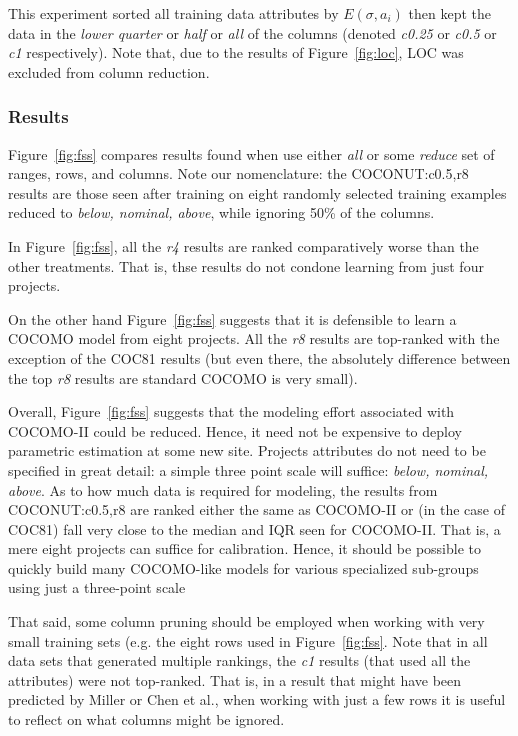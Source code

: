 \documentclass{sig-alternate}
\newcommand{\fig}[1]{Figure~\ref{fig:#1}}
\begin{document}
This experiment sorted all training data attributes by $E(\sigma,a_i)$ then kept
the data in the {\em lower quarter} or  {\em half} or {\em all} of  the columns
(denoted {\em c0.25} or {\em c0.5} or {\em c1} respectively).
Note that, due to the results of \fig{loc}, LOC was excluded from column reduction.



\subsubsection{Results}

\fig{fss} compares results found when use either
{\em all} or some {\em reduce} set of ranges, rows,
and columns. Note our nomenclature:  the
COCONUT:c0.5,r8  results are those
seen after training on eight randomly selected
training examples reduced to {\em below, nominal,
above}, while ignoring 50\% of the columns. 

In \fig{fss}, all the {\em r4} results are ranked
comparatively worse than the other treatments.  That
is, thse results do not condone learning from just
four projects.

On the other hand \fig{fss} suggests that it is defensible
to learn a COCOMO model from eight projects. All the
{\em r8} results are top-ranked with the exception
of the COC81 results (but even there, the absolutely
difference between the top {\em r8} results are
standard COCOMO is very small).

Overall, \fig{fss} suggests that the modeling
effort associated with COCOMO-II could be reduced. Hence,
it need not be expensive to deploy parametric estimation
at some new site.
Projects attributes
do not need to be specified in great detail:
a simple three point scale will suffice:
 {\em below, nominal, above}. As to how much data is
required for modeling, 
the results
from COCONUT:c0.5,r8 are ranked either the same as
COCOMO-II or (in the case of COC81) fall very close
to the median and IQR seen for COCOMO-II.
That is, 
a mere eight projects can
suffice for calibration.
Hence, it
should be possible to quickly build many COCOMO-like
models for various specialized sub-groups using just
a three-point scale

That said, some column pruning should be employed
when working with very small training sets (e.g.
the eight rows used in \fig{fss}. 
Note that
in all data sets that generated multiple rankings,
the {\em c1} results (that used all the attributes)
were not top-ranked. That is, in a result that might
have been predicted by Miller or Chen et al., when
working with just a few rows it is useful to
reflect on what columns might be ignored.
\end{document}
